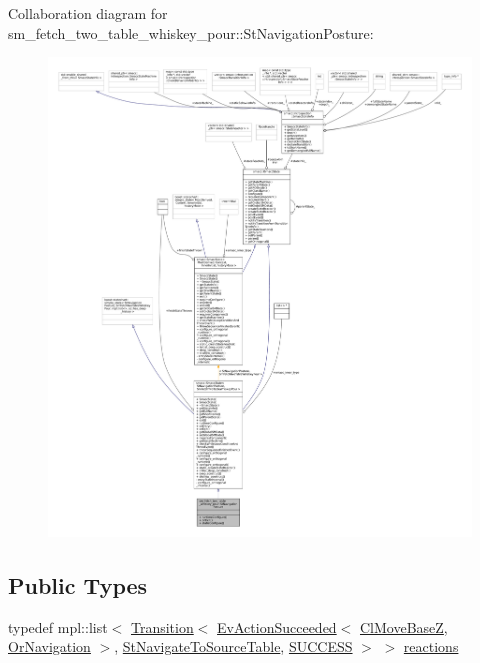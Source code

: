 Collaboration diagram for sm\+\_\+fetch\+\_\+two\+\_\+table\+\_\+whiskey\+\_\+pour\+:\+:St\+Navigation\+Posture\+:
\nopagebreak
\begin{figure}[H]
\begin{center}
\leavevmode
\includegraphics[width=350pt]{structsm__fetch__two__table__whiskey__pour_1_1StNavigationPosture__coll__graph}
\end{center}
\end{figure}
\subsection*{Public Types}
\begin{DoxyCompactItemize}
\item 
typedef mpl\+::list$<$ \hyperlink{classsmacc_1_1Transition}{Transition}$<$ \hyperlink{structsmacc_1_1default__events_1_1EvActionSucceeded}{Ev\+Action\+Succeeded}$<$ \hyperlink{classcl__move__base__z_1_1ClMoveBaseZ}{Cl\+Move\+BaseZ}, \hyperlink{classsm__fetch__two__table__whiskey__pour_1_1OrNavigation}{Or\+Navigation} $>$, \hyperlink{structsm__fetch__two__table__whiskey__pour_1_1StNavigateToSourceTable}{St\+Navigate\+To\+Source\+Table}, \hyperlink{structsmacc_1_1default__transition__tags_1_1SUCCESS}{S\+U\+C\+C\+E\+SS} $>$ $>$ \hyperlink{structsm__fetch__two__table__whiskey__pour_1_1StNavigationPosture_a4367f8be96d80533965e34ed22042e1f}{reactions}
\end{DoxyCompactItemize}
